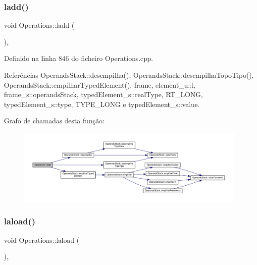 \subsubsection{\texorpdfstring{ladd()}{ladd()}}
{\footnotesize\ttfamily void Operations\+::ladd (\begin{DoxyParamCaption}{ }\end{DoxyParamCaption})\hspace{0.3cm}{\ttfamily [static]}, {\ttfamily [private]}}



Definido na linha 846 do ficheiro Operations.\+cpp.



Referências Operands\+Stack\+::desempilha(), Operands\+Stack\+::desempilha\+Topo\+Tipo(), Operands\+Stack\+::empilhar\+Typed\+Element(), frame, element\+\_\+u\+::l, frame\+\_\+s\+::operands\+Stack, typed\+Element\+\_\+s\+::real\+Type, R\+T\+\_\+\+L\+O\+NG, typed\+Element\+\_\+s\+::type, T\+Y\+P\+E\+\_\+\+L\+O\+NG e typed\+Element\+\_\+s\+::value.

Grafo de chamadas desta função\+:
\nopagebreak
\begin{figure}[H]
\begin{center}
\leavevmode
\includegraphics[width=350pt]{classOperations_ad4b153d687baa98c26fcfe7c24e12f45_cgraph}
\end{center}
\end{figure}
\mbox{\label{classOperations_a064f10825e8f0153ef19d466845d3734}} 
\subsubsection{\texorpdfstring{laload()}{laload()}}
{\footnotesize\ttfamily void Operations\+::laload (\begin{DoxyParamCaption}{ }\end{DoxyParamCaption})\hspace{0.3cm}{\ttfamily [static]}, {\ttfamily [private]}}



